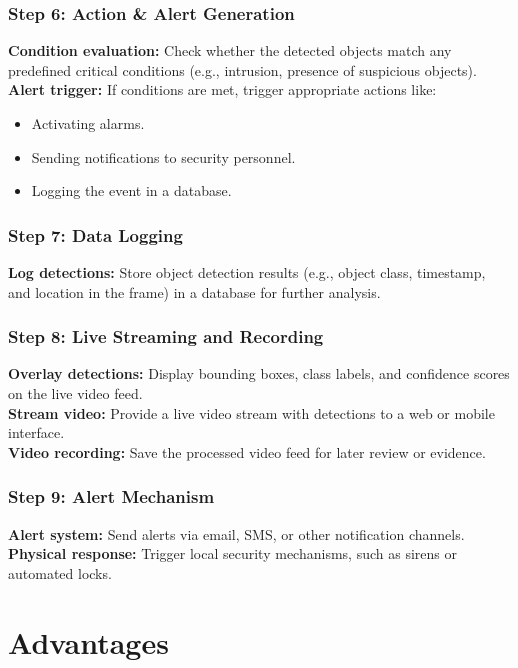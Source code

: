 \documentclass[openany,12pt]{report}
\begin{document}
\subsection*{Step 6: Action \& Alert Generation}
\textbf{Condition evaluation:} Check whether the detected objects match any predefined critical conditions (e.g., intrusion, presence of suspicious objects). \\
\textbf{Alert trigger:} If conditions are met, trigger appropriate actions like:
\begin{itemize}
    \item Activating alarms.
    \item Sending notifications to security personnel.
    \item Logging the event in a database.
\end{itemize}

\subsection*{Step 7: Data Logging}
\textbf{Log detections:} Store object detection results (e.g., object class, timestamp, and location in the frame) in a database for further analysis.

\subsection*{Step 8: Live Streaming and Recording}
\textbf{Overlay detections:} Display bounding boxes, class labels, and confidence scores on the live video feed. \\
\textbf{Stream video:} Provide a live video stream with detections to a web or mobile interface. \\
\textbf{Video recording:} Save the processed video feed for later review or evidence.

\subsection*{Step 9: Alert Mechanism}
\textbf{Alert system:} Send alerts via email, SMS, or other notification channels. \\
\textbf{Physical response:} Trigger local security mechanisms, such as sirens or automated locks.



\hspace*{0.5in}
\chapter {Advantages}
\end{document}
